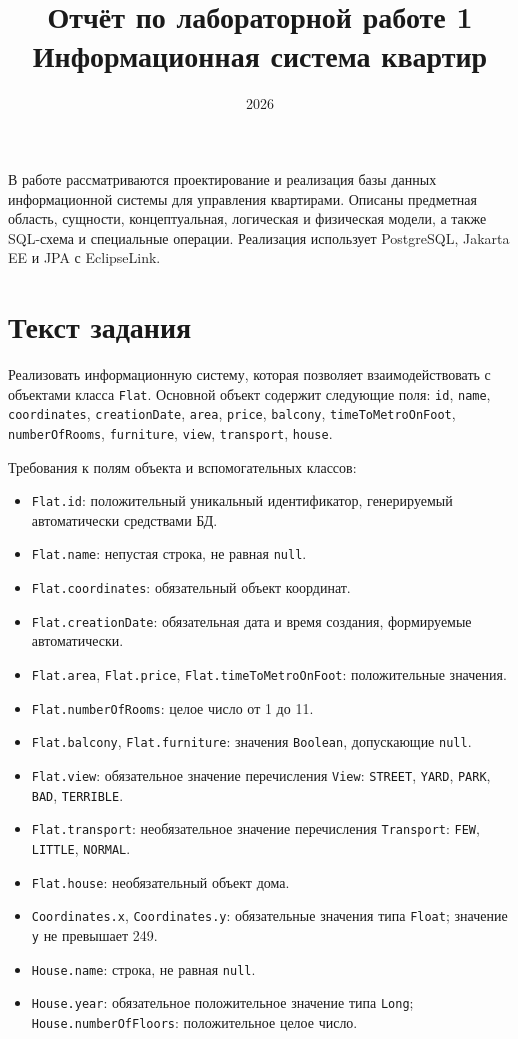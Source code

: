 \documentclass[12pt,a4paper]{article}
\title{Отчёт по лабораторной работе 1\\Информационная система квартир}
\author{}
\date{2026}
\begin{document}
\maketitle

В работе рассматриваются проектирование и реализация базы данных информационной
системы для управления квартирами. Описаны предметная область, сущности,
концептуальная, логическая и физическая модели, а также SQL-схема и специальные
операции. Реализация использует PostgreSQL, Jakarta EE и JPA с EclipseLink.

\section{Текст задания}

Реализовать информационную систему, которая позволяет взаимодействовать с
объектами класса \texttt{Flat}. Основной объект содержит следующие поля:
\texttt{id}, \texttt{name}, \texttt{coordinates}, \texttt{creationDate},
\texttt{area}, \texttt{price}, \texttt{balcony}, \texttt{timeToMetroOnFoot},
\texttt{numberOfRooms}, \texttt{furniture}, \texttt{view}, \texttt{transport},
\texttt{house}.

Требования к полям объекта и вспомогательных классов:
\begin{itemize}
  \item \texttt{Flat.id}: положительный уникальный идентификатор,
  генерируемый автоматически средствами БД.
  \item \texttt{Flat.name}: непустая строка, не равная \texttt{null}.
  \item \texttt{Flat.coordinates}: обязательный объект координат.
  \item \texttt{Flat.creationDate}: обязательная дата и время создания,
  формируемые автоматически.
  \item \texttt{Flat.area}, \texttt{Flat.price},
  \texttt{Flat.timeToMetroOnFoot}: положительные значения.
  \item \texttt{Flat.numberOfRooms}: целое число от 1 до 11.
  \item \texttt{Flat.balcony}, \texttt{Flat.furniture}: значения
  \texttt{Boolean}, допускающие \texttt{null}.
  \item \texttt{Flat.view}: обязательное значение перечисления
  \texttt{View}: \texttt{STREET}, \texttt{YARD}, \texttt{PARK},
  \texttt{BAD}, \texttt{TERRIBLE}.
  \item \texttt{Flat.transport}: необязательное значение перечисления
  \texttt{Transport}: \texttt{FEW}, \texttt{LITTLE}, \texttt{NORMAL}.
  \item \texttt{Flat.house}: необязательный объект дома.
  \item \texttt{Coordinates.x}, \texttt{Coordinates.y}: обязательные значения
  типа \texttt{Float}; значение \texttt{y} не превышает 249.
  \item \texttt{House.name}: строка, не равная \texttt{null}.
  \item \texttt{House.year}: обязательное положительное значение типа
  \texttt{Long}; \texttt{House.numberOfFloors}: положительное целое число.
\end{itemize}
\end{document}
